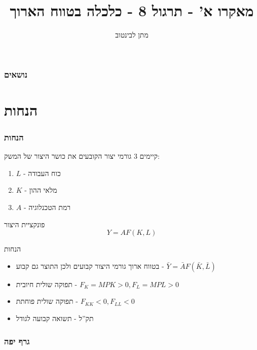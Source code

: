\documentclass[usenames,dvipsnames]{beamer}
\title[]{{מאקרו א' - תרגול  8 - כלכלה בטווח הארוך}}
\author{\texthebrew{ מתן לבינטוב}}
\institute[{{ אב"ג}}]{{ אוניברסיטת בן גוריון בנגב}}
\date{}
\begin{document}
\begin{RTL}
\begin{frame}
\titlepage
\end{frame}
\begin{frame}
    \frametitle{נושאים}
    \tableofcontents
    

\end{frame}
\section{הנחות}
\begin{frame}[allowframebreaks]
    \frametitle{הנחות}
    קיימים 3 גורמי יצור הקובעים את כושר היצור של המשק: 
    \begin{enumerate}
        \item $L$ - כוח העבודה
        \item $K$ - מלאי ההון
        \item $A$ - רמת הטכנלוגיה
    \end{enumerate}

    \begin{block}{פונקציית היצור}
        $$Y = AF(K,L)$$
    \end{block}
    \begin{block}{הנחות}
        \begin{itemize}
            \item בטווח ארוך גורמי היצור קבועים ולכן התוצר גם קבוע - $\bar Y = \bar A F(\bar K, \bar L)$
            \item תפוקה שולית חיובית - $F_K = MPK > 0 , F_L = MPL > 0$
            \item תפוקה שולית פוחתת - $F_{KK} < 0 , F_{LL} < 0$
            \item תק''ל - תשואה קבועה לגודל
        \end{itemize}
    \end{block}
    \end{frame}

    \begin{frame}
        \frametitle{גרף יפה}
        \begin{center}
        \end{center}
    

\end{frame}
\end{RTL}
\end{document}
